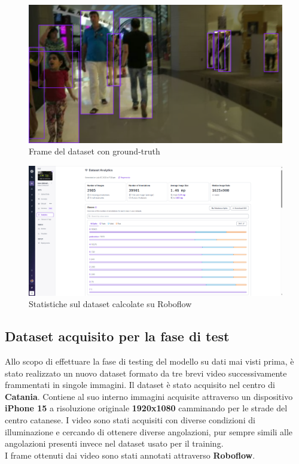 \documentclass[12pt]{article}
\begin{document}
\begin{figure}[H]
    \centering
    \includegraphics[width=1.00\textwidth]{./img/dataset-ground-truth.png}
    \caption{Frame del dataset con ground-truth}
    \label{fig:dataset-frame-2}
\end{figure}

\begin{figure}[H]
    \centering
    \includegraphics[width=1.0\textwidth]{./img/roboflow-dataset.png}
    \caption{Statistiche sul dataset calcolate su Roboflow}
    \label{fig:roboflow-dataset}
\end{figure}

\subsection{Dataset acquisito per la fase di test}
Allo scopo di effettuare la fase di testing del modello su dati mai visti prima, è stato realizzato un nuovo dataset\cite{TestSet} formato da tre brevi video successivamente frammentati in singole immagini. Il dataset è stato acquisito nel centro di \textbf{Catania}. Contiene al suo interno immagini acquisite attraverso un dispositivo \textbf{iPhone 15} a risoluzione originale \textbf{1920x1080} camminando per le strade del centro catanese. I video sono stati acquisiti con diverse condizioni di illuminazione e cercando di ottenere diverse angolazioni, pur sempre simili alle angolazioni presenti invece nel dataset usato per il training. \\
I frame ottenuti dai video sono stati annotati attraverso \textbf{Roboflow}.
\end{document}
